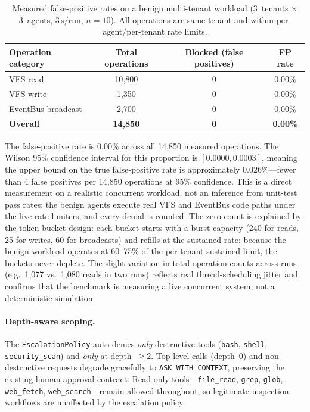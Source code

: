 \begin{table}[t]
\centering
\caption{Measured false-positive rates on a benign multi-tenant workload
(3~tenants $\times$ 3~agents, 3\,s/run, $n=10$). All operations are
same-tenant and within per-agent/per-tenant rate limits.}
\label{tab:fp}
\begin{tabular}{lccc}
\toprule
Operation category & Total operations & Blocked (false positives) & FP rate \\
\midrule
VFS read            & 10{,}800 & 0 & 0.00\% \\
VFS write           &  1{,}350 & 0 & 0.00\% \\
EventBus broadcast  &  2{,}700 & 0 & 0.00\% \\
\midrule
\textbf{Overall}    & \textbf{14{,}850} & \textbf{0} & \textbf{0.00\%} \\
\bottomrule
\end{tabular}
\end{table}

The false-positive rate is 0.00\% across all 14{,}850 measured operations.
The Wilson 95\% confidence interval for this proportion is
$[0.0000, 0.0003]$, meaning the upper bound on the true false-positive rate
is approximately $0.026\%$---fewer than 4 false positives per 14{,}850
operations at 95\% confidence. This is a direct measurement on a realistic
concurrent workload, not an inference from unit-test pass rates: the benign
agents execute real VFS and EventBus code paths under the live rate
limiters, and every denial is counted. The zero count is explained by the
token-bucket design: each bucket starts with a burst capacity (240 for
reads, 25 for writes, 60 for broadcasts) and refills at the sustained rate;
because the benign workload operates at 60--75\% of the per-tenant sustained
limit, the buckets never deplete. The slight variation in total operation
counts across runs (e.g.\ 1{,}077 vs.\ 1{,}080 reads in two runs) reflects
real thread-scheduling jitter and confirms that the benchmark is measuring a
live concurrent system, not a deterministic simulation.

\paragraph{Depth-aware scoping.}
The \texttt{EscalationPolicy} auto-denies \emph{only} destructive tools
(\texttt{bash}, \texttt{shell}, \texttt{security\_scan}) and \emph{only} at
depth~$\geq 2$. Top-level calls (depth~0) and non-destructive requests degrade
gracefully to \texttt{ASK\_WITH\_CONTEXT}, preserving the existing human
approval contract. Read-only tools---\texttt{file\_read}, \texttt{grep},
\texttt{glob}, \texttt{web\_fetch}, \texttt{web\_search}---remain allowed
throughout, so legitimate inspection workflows are unaffected by the
escalation policy.


